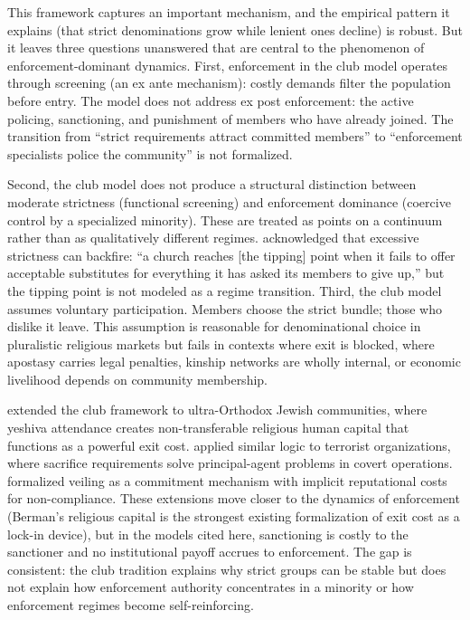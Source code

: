 \documentclass[12pt]{article}
\begin{document}
This framework captures an important mechanism, and the empirical pattern it explains (that strict denominations grow while lenient ones decline) is robust. But it leaves three questions unanswered that are central to the phenomenon of enforcement-dominant dynamics. First, enforcement in the club model operates through screening (an ex ante mechanism): costly demands filter the population before entry. The model does not address ex post enforcement: the active policing, sanctioning, and punishment of members who have already joined. The transition from ``strict requirements attract committed members'' to ``enforcement specialists police the community'' is not formalized.

Second, the club model does not produce a structural distinction between moderate strictness (functional screening) and enforcement dominance (coercive control by a specialized minority). These are treated as points on a continuum rather than as qualitatively different regimes. \citet{iannaccone1994} acknowledged that excessive strictness can backfire: ``a church reaches [the tipping] point when it fails to offer acceptable substitutes for everything it has asked its members to give up,'' but the tipping point is not modeled as a regime transition. Third, the club model assumes voluntary participation. Members choose the strict bundle; those who dislike it leave. This assumption is reasonable for denominational choice in pluralistic religious markets but fails in contexts where exit is blocked, where apostasy carries legal penalties, kinship networks are wholly internal, or economic livelihood depends on community membership.

\citet{berman2000} extended the club framework to ultra-Orthodox Jewish communities, where yeshiva attendance creates non-transferable religious human capital that functions as a powerful exit cost. \citet{bermanlaitin2008} applied similar logic to terrorist organizations, where sacrifice requirements solve principal-agent problems in covert operations. \citet{carvalho2013} formalized veiling as a commitment mechanism with implicit reputational costs for non-compliance. These extensions move closer to the dynamics of enforcement (Berman's religious capital is the strongest existing formalization of exit cost as a lock-in device), but in the models cited here, sanctioning is costly to the sanctioner and no institutional payoff accrues to enforcement. The gap is consistent: the club tradition explains why strict groups can be stable but does not explain how enforcement authority concentrates in a minority or how enforcement regimes become self-reinforcing.
\end{document}
